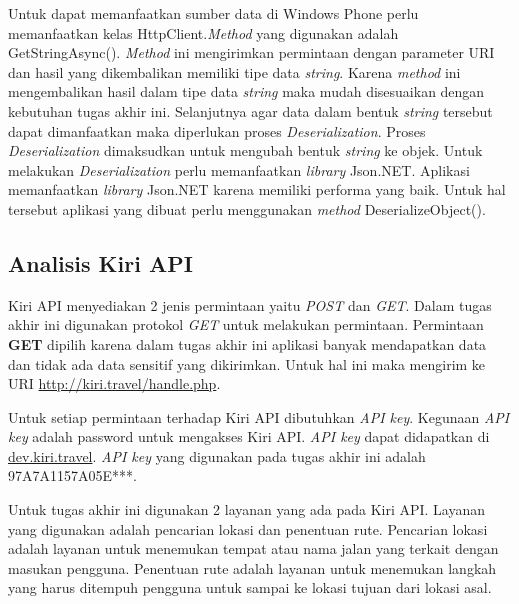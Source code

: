 Untuk dapat memanfaatkan sumber data di Windows Phone perlu memanfaatkan kelas HttpClient.\textit{Method} yang digunakan adalah GetStringAsync(). \textit{Method} ini mengirimkan permintaan dengan parameter URI dan hasil yang dikembalikan memiliki tipe data \textit{string}. Karena \textit{method} ini mengembalikan hasil dalam tipe data \textit{string} maka mudah disesuaikan dengan kebutuhan tugas akhir ini. Selanjutnya agar data dalam bentuk \textit{string} tersebut dapat dimanfaatkan maka diperlukan proses \textit{Deserialization}. Proses \textit{Deserialization} dimaksudkan untuk mengubah bentuk \textit{string} ke objek. Untuk melakukan \textit{Deserialization} perlu memanfaatkan \textit{library} Json.NET. Aplikasi memanfaatkan \textit{library} Json.NET karena memiliki performa yang baik. Untuk hal tersebut aplikasi yang dibuat perlu menggunakan \textit{method} DeserializeObject().

\subsection{Analisis Kiri API}
\label{lab:Analisis Kiri API}
\hspace{0.5cm} Kiri API menyediakan 2 jenis permintaan yaitu \textit{POST} dan \textit{GET}. Dalam tugas akhir ini digunakan protokol \textit{GET} untuk melakukan permintaan. Permintaan \textbf{GET} dipilih karena dalam tugas akhir ini aplikasi banyak mendapatkan data dan tidak ada data sensitif yang dikirimkan. Untuk hal ini maka mengirim ke URI \url{http://kiri.travel/handle.php}.

Untuk setiap permintaan terhadap Kiri API dibutuhkan \textit{API key}. Kegunaan \textit{API key} adalah password untuk mengakses Kiri API. \textit{API key} dapat didapatkan di \url{dev.kiri.travel}. \textit{API key} yang digunakan pada tugas akhir ini adalah 97A7A1157A05E***. %
     
Untuk tugas akhir ini digunakan 2 layanan yang ada pada Kiri API. Layanan yang digunakan adalah pencarian lokasi dan penentuan rute. Pencarian lokasi adalah layanan untuk menemukan tempat atau nama jalan yang terkait dengan masukan pengguna. Penentuan rute adalah layanan untuk menemukan langkah yang harus ditempuh pengguna untuk sampai ke lokasi tujuan dari lokasi asal. 

